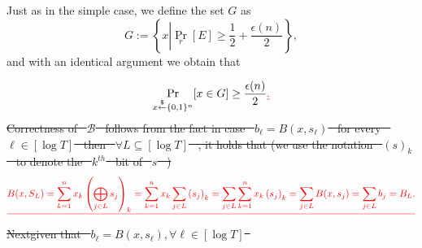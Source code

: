 \documentclass[12pt]{tufte-book}
\providecommand{\DIFadd}[1]{{\protect\color{blue}\uwave{#1}}} %
\providecommand{\DIFdel}[1]{{\protect\color{red}\sout{#1}}}                      %
\providecommand{\DIFaddbegin}{} %
\providecommand{\DIFaddend}{} %
\providecommand{\DIFdelbegin}{} %
\providecommand{\DIFdelend}{} %
\newcommand{\DIFscaledelfig}{0.5}
\newlength{\DIFdelgraphicswidth} %
\newlength{\DIFdelgraphicsheight} %
\newcommand{\DIFaddincludegraphics}[2][]{{\color{blue}\fbox{\DIFOincludegraphics[#1]{#2}}}} %
\newcommand{\DIFdelincludegraphics}[2][]{%
\sbox{\DIFdelgraphicsbox}{\DIFOincludegraphics[#1]{#2}}%
\settoboxwidth{\DIFdelgraphicswidth}{\DIFdelgraphicsbox} %
\settoboxtotalheight{\DIFdelgraphicsheight}{\DIFdelgraphicsbox} %
\scalebox{\DIFscaledelfig}{%
\parbox[b]{\DIFdelgraphicswidth}{\usebox{\DIFdelgraphicsbox}\\[-\baselineskip] \rule{\DIFdelgraphicswidth}{0em}}\llap{\resizebox{\DIFdelgraphicswidth}{\DIFdelgraphicsheight}{%
\setlength{\unitlength}{\DIFdelgraphicswidth}%
\begin{picture}(1,1)%
\thicklines\linethickness{2pt} %
{\color[rgb]{1,0,0}\put(0,0){\framebox(1,1){}}}%
{\color[rgb]{1,0,0}\put(0,0){\line( 1,1){1}}}%
{\color[rgb]{1,0,0}\put(0,1){\line(1,-1){1}}}%
\end{picture}%
}\hspace*{3pt}}} %
} %
\DeclareRobustCommand{\DIFaddbegin}{\DIFOaddbegin \let\includegraphics\DIFaddincludegraphics} %
\DeclareRobustCommand{\DIFaddend}{\DIFOaddend \let\includegraphics\DIFOincludegraphics} %
\DeclareRobustCommand{\DIFdelbegin}{\DIFOdelbegin \let\includegraphics\DIFdelincludegraphics} %
\DeclareRobustCommand{\DIFdelend}{\DIFOaddend \let\includegraphics\DIFOincludegraphics} %
\begin{document}
\DIFaddend Just as in the simple case, we define the set $G$ as
$$G := \left\{x \left| \Pr_r \left[ E \right]\geq \frac{1}{2} + \frac{\epsilon(n)}{2} \right. \right\},$$
and with an identical argument we obtain that\DIFaddbegin \DIFadd{:
}

\DIFaddend $$\Pr_{x \stackrel{\$}{\leftarrow} \binset{n}}[x \in G] \geq \frac{\epsilon(n)}{2}\DIFdelbegin \DIFdel{.}\DIFdelend $$
\DIFdelbegin %
\DIFdel{Correctness of \mbox{%
$\mathcal{B}$
}%
follows from the fact in case \mbox{%
$b_\ell = B(x,s_\ell)$
}%
for every \mbox{%
$\ell \in [\log T]$
}%
then \mbox{%
$\forall L \subseteq [\log T]$
}%
, it holds that (we use the notation \mbox{%
$(s)_k$
}%
to denote the \mbox{%
$k^{th}$
}%
bit of \mbox{%
$s$
}%
)
}\begin{displaymath}\DIFdel{B(x,S_L) = \sum_{k=1}^n x_k \left(\bigoplus_{j \in L} s_j\right)_k =  \sum_{k=1}^n x_k \sum_{j \in L} \left(s_j\right)_k = \sum_{j \in L} \sum_{k=1}^n x_k \left(s_j\right)_k = \sum_{j \in L}B(x,s_j) = \sum_{j\in L} b_j  = B_L.}\end{displaymath}%
\DIFdel{Nextgiven that \mbox{%
$b_\ell = B(x,s_\ell), \forall \ell \in [\log T]$
}%
}\DIFdelend \DIFaddbegin 
\end{document}
